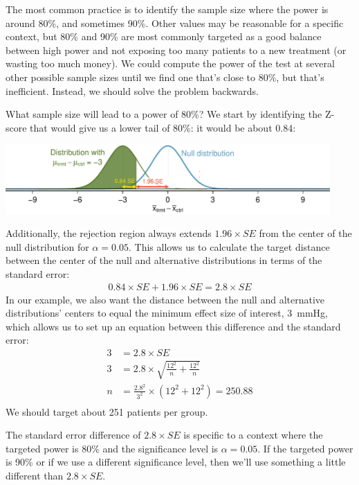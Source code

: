 The most common practice is to identify the sample size where the power is around 80\%, and sometimes 90\%. Other values may be reasonable for a specific context, but 80\% and 90\% are most commonly targeted as a good balance between high power and not exposing too many patients to a new treatment (or wasting too much money). We could compute the power of the test at several other possible sample sizes until we find one that's close to 80\%, but that's inefficient. Instead, we should solve the problem backwards.

\begin{example}{What sample size will lead to a power of 80\%?}
We start by identifying the Z-score that would give us a lower tail of 80\%: it would be about 0.84:
\begin{center}
\includegraphics[width=0.93\textwidth]{ch_inference_for_means/figures/power_best_sample_size/power_best_sample_size}
\end{center}
Additionally, the rejection region always extends $1.96\times SE$ from the center of the null distribution for $\alpha = 0.05$. This allows us to calculate the target distance between the center of the null and alternative distributions in terms of the standard error:
\begin{align*}
0.84 \times SE + 1.96 \times SE = 2.8 \times SE
\end{align*}
In our example, we also want the distance between the null and alternative distributions' centers to equal the minimum effect size of interest, 3~mmHg, which allows us to set up an equation between this difference and the standard error:
\begin{align*}
3 &= 2.8 \times SE \\
3 &= 2.8 \times \sqrt{\frac{12^2}{n} + \frac{12^2}{n}} \\
n &= \frac{2.8^2}{3^2} \times \left( 12^2 + 12^2 \right) = 250.88 \\
\end{align*}
We should target about 251 patients per group.
\end{example}

The standard error difference of $2.8 \times SE$ is specific to a context where the targeted power is 80\% and the significance level is $\alpha = 0.05$. If the targeted power is 90\% or if we use a different significance level, then we'll use something a little different than $2.8 \times SE$.

